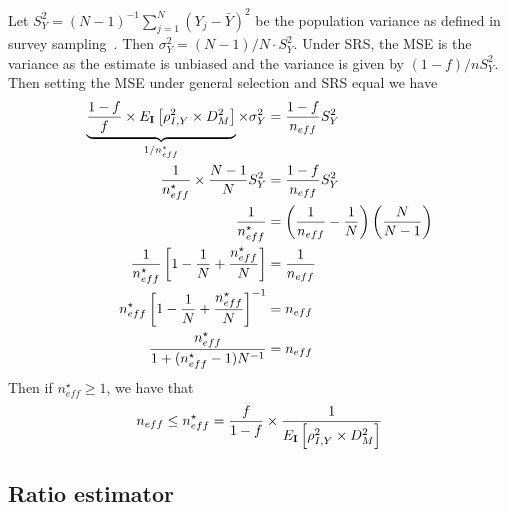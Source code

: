 \documentclass[12pt]{article}
\def\I{{\bf I}}
\begin{document}
Let $S_Y^2 = (N-1)^{-1} \sum_{j=1}^N (Y_j - \bar Y)^2$ be the population variance as defined in survey sampling~\cite{Cochran77}.  Then $\sigma_Y^2 = (N-1)/N \cdot S_Y^2$.  Under SRS, the MSE is the variance as the estimate is unbiased and the variance is given by $(1-f)/n S_Y^2$.  Then setting the MSE under general selection and SRS equal we have
$$
\begin{aligned}
\underbrace{\frac{1-f}{f} \times E_{\I} \left[ \rho_{I, Y}^2 \times D_M^2 \right]}_{1/n_{eff}^\star} \times \sigma_Y^2 &= \frac{1-f}{n_{eff}} S_Y^2 \\
\frac{1}{n_{eff}^\star} \times \frac{N-1}{N} S_Y^2 &= \frac{1-f}{n_{eff}} S_Y^2 \\
\frac{1}{n_{eff}^\star} &=  \left( \frac{1}{n_{eff}} - \frac{1}{N} \right) \left( \frac{N}{N-1} \right) \\
\frac{1}{n_{eff}^\star} \left[ 1 - \frac{1}{N} + \frac{n_{eff}^\star}{N} \right]  &=  \frac{1}{n_{eff}} \\
n_{eff}^\star \left[ 1 - \frac{1}{N} + \frac{n_{eff}^\star}{N} \right]^{-1}  &=  n_{eff} \\
\frac{n_{eff}^\star}{ 1 + (n_{eff}^\star -1) N^{-1}} &=  n_{eff} \\
\end{aligned}
$$
Then if $n_{eff}^\star \geq 1$, we have that
$$
n_{eff} \leq n_{eff}^\star = \frac{f}{1-f} \times \frac{1}{E_{\I} \left[ \rho^2_{I, Y} \times D_M^2 \right]}
$$


\subsection*{Ratio estimator}
\label{app:ratio}
\end{document}
